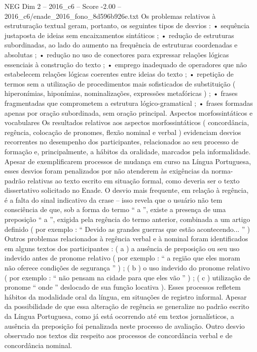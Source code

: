 \begin{textsample}{NEG Dim 2 – 2016\_c6 – Score -2.00 – 2016\_c6/enade\_2016\_fono\_8d596b926e.txt}
Os problemas relativos à estruturação textual geram, portanto, os seguintes tipos de desvios : • sequência justaposta de ideias sem encaixamentos sintáticos ; • redução de estruturas subordinadas, ao lado do aumento na frequência de estruturas coordenadas e absolutas ; • redução no uso de conectores para expressar relações lógicas essenciais à construção do texto ; • emprego inadequado de operadores que não estabelecem relações lógicas coerentes entre ideias do texto ; • repetição de termos sem a utilização de procedimentos mais sofisticados de substituição ( hiperonímias, hiponímias, nominalizações, expressões metafóricas ) ; • frases fragmentadas que comprometem a estrutura lógico-gramatical ; • frases formadas apenas por oração subordinada, sem oração principal.
Aspectos morfossintáticos e vocabulares Os resultados relativos aos aspectos morfossintáticos ( concordância, regência, colocação de pronomes, flexão nominal e verbal ) evidenciam desvios recorrentes no desempenho dos participantes, relacionados ao seu processo de formação e, principalmente, a hábitos da oralidade, marcados pela informalidade.
Apesar de exemplificarem processos de mudança em curso na Língua Portuguesa, esses desvios foram penalizados por não atenderem às exigências da norma-padrão relativas ao texto escrito em situação formal, como deveria ser o texto dissertativo solicitado no Enade.
O desvio mais frequente, em relação à regência, é a falta do sinal indicativo da crase – isso revela que o usuário não tem consciência de que, sob a forma do termo “ a ”, existe a presença de uma preposição “ a ”, exigida pela regência do termo anterior, combinada a um artigo definido ( por exemplo : “ Devido as grandes guerras que estão acontecendo... ” ) Outros problemas relacionados à regência verbal e à nominal foram identificados em alguns textos dos participantes : ( a ) a ausência de preposição ou seu uso indevido antes de pronome relativo ( por exemplo : “ a região que eles moram não oferece condições de segurança ” ) ; ( b ) o uso indevido do pronome relativo ( por exemplo : “ não pensam na cidade para que eles vão ” ) ; ( c ) utilização de pronome “ onde ” deslocado de sua função locativa ).
Esses processos refletem hábitos da modalidade oral da língua, em situações de registro informal.
Apesar da possibilidade de que essa alteração de regência se generalize no padrão escrito da Língua Portuguesa, como já está ocorrendo até em textos jornalísticos, a ausência da preposição foi penalizada neste processo de avaliação.
Outro desvio observado nos textos diz respeito aos processos de concordância verbal e de concordância nominal.

\end{textsample}
